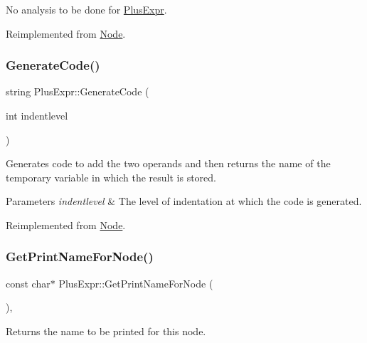 No analysis to be done for \hyperlink{class_plus_expr}{Plus\+Expr}. 

Reimplemented from \hyperlink{class_node_a5f88d55c6f253a29def7ccc443d83d47}{Node}.

\mbox{\label{class_plus_expr_ab8ade880fd47a7a0142c21439f83ca10}} 
\subsubsection{\texorpdfstring{Generate\+Code()}{GenerateCode()}}
{\footnotesize\ttfamily string Plus\+Expr\+::\+Generate\+Code (\begin{DoxyParamCaption}\item[{int}]{indentlevel }\end{DoxyParamCaption})\hspace{0.3cm}{\ttfamily [virtual]}}

Generates code to add the two operands and then returns the name of the temporary variable in which the result is stored. 
\begin{DoxyParams}{Parameters}
{\em indentlevel} & The level of indentation at which the code is generated. \\
\hline
\end{DoxyParams}


Reimplemented from \hyperlink{class_node_acb60e526730e8436056375a3055c2c32}{Node}.

\mbox{\label{class_plus_expr_a37b598c579f8de2b61cd93cc5d28c973}} 
\subsubsection{\texorpdfstring{Get\+Print\+Name\+For\+Node()}{GetPrintNameForNode()}}
{\footnotesize\ttfamily const char$\ast$ Plus\+Expr\+::\+Get\+Print\+Name\+For\+Node (\begin{DoxyParamCaption}{ }\end{DoxyParamCaption})\hspace{0.3cm}{\ttfamily [inline]}, {\ttfamily [virtual]}}

Returns the name to be printed for this node. 


